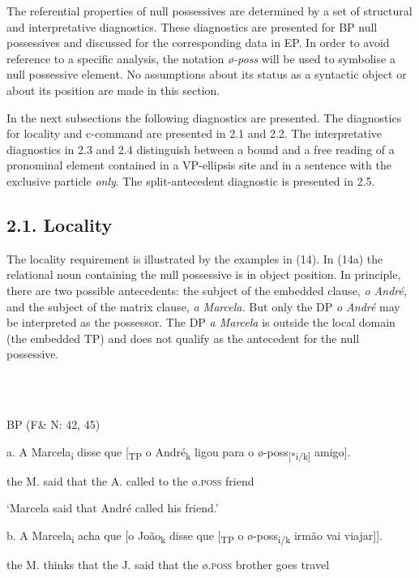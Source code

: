 \documentclass[output=paper]{langsci/langscibook}
\begin{document}
The referential properties of null possessives are determined by a set of structural and interpretative diagnostics. These diagnostics are presented for BP null possessives and discussed for the corresponding data in EP. In order to avoid reference to a specific analysis, the notation \textit{ø-poss} will be used to symbolise a null possessive element. No assumptions about its status as a syntactic object or about its position are made in this section.  

In the next subsections the following diagnostics are presented. The diagnostics for locality and c-command are presented in 2.1 and 2.2. The interpretative diagnostics in 2.3 and 2.4 distinguish between a bound and a free reading of a pronominal element contained in a VP-ellipsis site and in a sentence with the exclusive particle \textit{only}. The split-antecedent diagnostic is presented in 2.5.

\subsection{ 2.1. Locality}

The locality requirement is illustrated by the examples in (14). In (14a) the relational noun containing the null possessive is in object position. In principle, there are two possible antecedents: the subject of the embedded clause, \textit{o André,} and the subject of the matrix clause, \textit{a Marcela.} But only the DP \textit{o André} may be interpreted as the possessor. The DP \textit{a Marcela} is outside the local domain (the embedded TP) and does not qualify as the antecedent for the null possessive. 

\ea%
    \label{ex:key:14}
    \gll\\
        \\
    \glt
    \z

          BP (F\& N: 42, 45)

  a.  A Marcela\textsubscript{i} disse que [\textsubscript{TP} o André\textsubscript{k} ligou para o ø-poss\textsubscript{[}\textsubscript{*i/k]} amigo].

the M. said that the A. called to the ø\textsc{.poss} friend

‘Marcela said that André called his friend.’

  b.  A Marcela\textsubscript{i} acha que [o João\textsubscript{k} disse que [\textsubscript{TP} o ø-poss\textsubscript{i/k} irmão vai viajar]].

the M. thinks that the J. said that the ø\textsc{.poss} brother goes travel
\end{document}
